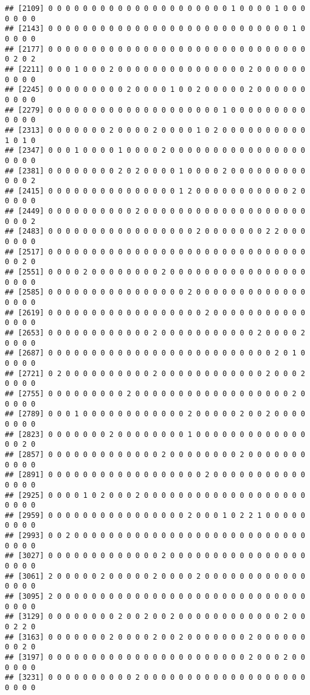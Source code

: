 \documentclass[12pt,]{article}
\begin{document}
\begin{verbatim}
## [2109] 0 0 0 0 0 0 0 0 0 0 0 0 0 0 0 0 0 0 0 0 0 1 0 0 0 0 1 0 0 0 0 0 0 0
## [2143] 0 0 0 0 0 0 0 0 0 0 0 0 0 0 0 0 0 0 0 0 0 0 0 0 0 0 0 0 1 0 0 0 0 0
## [2177] 0 0 0 0 0 0 0 0 0 0 0 0 0 0 0 0 0 0 0 0 0 0 0 0 0 0 0 0 0 0 0 2 0 2
## [2211] 0 0 0 1 0 0 0 2 0 0 0 0 0 0 0 0 0 0 0 0 0 0 0 2 0 0 0 0 0 0 0 0 0 0
## [2245] 0 0 0 0 0 0 0 0 0 2 0 0 0 0 1 0 0 2 0 0 0 0 0 2 0 0 0 0 0 0 0 0 0 0
## [2279] 0 0 0 0 0 0 0 0 0 0 0 0 0 0 0 0 0 0 0 0 1 0 0 0 0 0 0 0 0 0 0 0 0 0
## [2313] 0 0 0 0 0 0 0 2 0 0 0 0 2 0 0 0 0 1 0 2 0 0 0 0 0 0 0 0 0 0 1 0 1 0
## [2347] 0 0 0 1 0 0 0 0 1 0 0 0 0 2 0 0 0 0 0 0 0 0 0 0 0 0 0 0 0 0 0 0 0 0
## [2381] 0 0 0 0 0 0 0 0 2 0 2 0 0 0 0 1 0 0 0 0 2 0 0 0 0 0 0 0 0 0 0 0 0 2
## [2415] 0 0 0 0 0 0 0 0 0 0 0 0 0 0 0 1 2 0 0 0 0 0 0 0 0 0 0 0 2 0 0 0 0 0
## [2449] 0 0 0 0 0 0 0 0 0 0 2 0 0 0 0 0 0 0 0 0 0 0 0 0 0 0 0 0 0 0 0 0 0 2
## [2483] 0 0 0 0 0 0 0 0 0 0 0 0 0 0 0 0 0 2 0 0 0 0 0 0 0 2 2 0 0 0 0 0 0 0
## [2517] 0 0 0 0 0 0 0 0 0 0 0 0 0 0 0 0 0 0 0 0 0 0 0 0 0 0 0 0 0 0 0 0 2 0
## [2551] 0 0 0 0 2 0 0 0 0 0 0 0 0 2 0 0 0 0 0 0 0 0 0 0 0 0 0 0 0 0 0 0 0 0
## [2585] 0 0 0 0 0 0 0 0 0 0 0 0 0 0 0 0 2 0 0 0 0 0 0 0 0 0 0 0 0 0 0 0 0 0
## [2619] 0 0 0 0 0 0 0 0 0 0 0 0 0 0 0 0 0 0 2 0 0 0 0 0 0 0 0 0 0 0 0 0 0 0
## [2653] 0 0 0 0 0 0 0 0 0 0 0 0 2 0 0 0 0 0 0 0 0 0 0 0 2 0 0 0 0 2 0 0 0 0
## [2687] 0 0 0 0 0 0 0 0 0 0 0 0 0 0 0 0 0 0 0 0 0 0 0 0 0 0 2 0 1 0 0 0 0 0
## [2721] 0 2 0 0 0 0 0 0 0 0 0 0 2 0 0 0 0 0 0 0 0 0 0 0 0 2 0 0 0 2 0 0 0 0
## [2755] 0 0 0 0 0 0 0 0 0 2 0 0 0 0 0 0 0 0 0 0 0 0 0 0 0 0 0 0 2 0 0 0 0 0
## [2789] 0 0 0 1 0 0 0 0 0 0 0 0 0 0 0 0 2 0 0 0 0 0 2 0 0 2 0 0 0 0 0 0 0 0
## [2823] 0 0 0 0 0 0 0 2 0 0 0 0 0 0 0 0 1 0 0 0 0 0 0 0 0 0 0 0 0 0 0 0 2 0
## [2857] 0 0 0 0 0 0 0 0 0 0 0 0 0 2 0 0 0 0 0 0 0 0 2 0 0 0 0 0 0 0 0 0 0 0
## [2891] 0 0 0 0 0 0 0 0 0 0 0 0 0 0 0 0 0 0 2 0 0 0 0 0 0 0 0 0 0 0 0 0 0 0
## [2925] 0 0 0 0 1 0 2 0 0 0 2 0 0 0 0 0 0 0 0 0 0 0 0 0 0 0 0 0 0 0 0 0 0 0
## [2959] 0 0 0 0 0 0 0 0 0 0 0 0 0 0 0 0 2 0 0 0 1 0 2 2 1 0 0 0 0 0 0 0 0 0
## [2993] 0 0 2 0 0 0 0 0 0 0 0 0 0 0 0 0 0 0 0 0 0 0 0 0 0 0 0 0 0 0 0 0 0 0
## [3027] 0 0 0 0 0 0 0 0 0 0 0 0 0 2 0 0 0 0 0 0 0 0 0 0 0 0 0 0 0 0 0 0 0 0
## [3061] 2 0 0 0 0 0 2 0 0 0 0 0 2 0 0 0 0 2 0 0 0 0 0 0 0 0 0 0 0 0 0 0 0 0
## [3095] 2 0 0 0 0 0 0 0 0 0 0 0 0 0 0 0 0 0 0 0 0 0 0 0 0 0 0 0 0 0 0 0 0 0
## [3129] 0 0 0 0 0 0 0 0 2 0 0 2 0 0 2 0 0 0 0 0 0 0 0 0 0 0 0 2 0 0 0 2 2 0
## [3163] 0 0 0 0 0 0 0 2 0 0 0 0 2 0 0 2 0 0 0 0 0 0 0 2 0 0 0 0 0 0 0 0 2 0
## [3197] 0 0 0 0 0 0 0 0 0 0 0 0 0 0 0 0 0 0 0 0 0 0 0 2 0 0 0 2 0 0 0 0 0 0
## [3231] 0 0 0 0 0 0 0 0 0 0 2 0 0 0 0 0 0 0 0 0 0 0 0 0 0 0 0 0 0 0 0 0 0 0

\end{verbatim}
\end{document}
